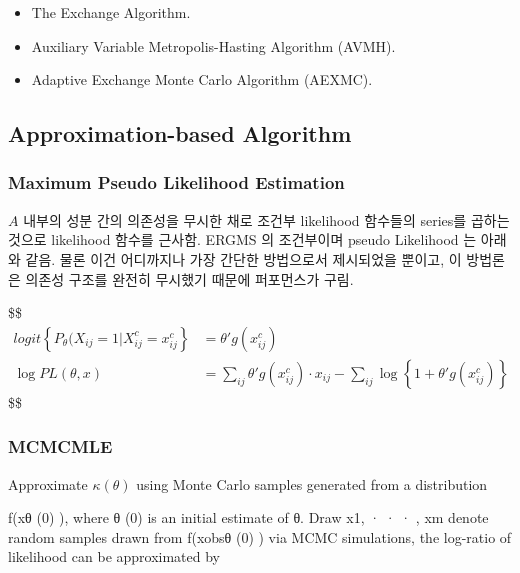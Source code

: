 \documentclass[
]{book}
\providecommand{\tightlist}{%
  \setlength{\itemsep}{0pt}\setlength{\parskip}{0pt}}
\begin{document}
{{{\begin{enumerate}
  \begin{itemize}
  \tightlist
  \item
    The Exchange Algorithm.
  \item
    Auxiliary Variable Metropolis-Hasting Algorithm (AVMH).
  \item
    Adaptive Exchange Monte Carlo Algorithm (AEXMC).
  \end{itemize}
\end{enumerate}

\hypertarget{approximation-based-algorithm}{%
\subsection{Approximation-based Algorithm}\label{approximation-based-algorithm}}

\hypertarget{maximum-pseudo-likelihood-estimation}{%
\subsubsection{Maximum Pseudo Likelihood Estimation}\label{maximum-pseudo-likelihood-estimation}}

\(A\) 내부의 성분 간의 의존성을 무시한 채로 조건부 likelihood 함수들의 series를 곱하는 것으로 likelihood 함수를 근사함. ERGMS 의 조건부이며 pseudo Likelihood 는 아래와 같음. 물론 이건 어디까지나 가장 간단한 방법으로서 제시되었을 뿐이고, 이 방법론은 의존성 구조를 완전히 무시했기 때문에 퍼포먼스가 구림.

\$\$
\begin{align}
logit \left \{ P_\theta \Big (X_{ij} = 1 \Big | X_{ij}^c = x_{ij}^c \right \} &= \theta ' g(x_{ij}^c)

\\

\log PL(\theta, x) &= \sum_{ij} \theta ' g(x_{ij}^c) \cdot x_{ij} - \sum_{ij}\log \left \{ 1+ \theta ' g(x_{ij}^c) \right \}

\end{align}
\$\$

\hypertarget{mcmcmle}{%
\subsubsection{MCMCMLE}\label{mcmcmle}}

Approximate \(\kappa(θ)\) using Monte Carlo samples generated from a
distribution

f(x\textbar θ
(0)
), where θ
(0)
is an initial estimate of θ.
Draw x1, · · · , xm denote random samples drawn from f(xobs\textbar θ
(0)
) via
MCMC simulations, the log-ratio of likelihood can be approximated by

}}}
\end{document}
